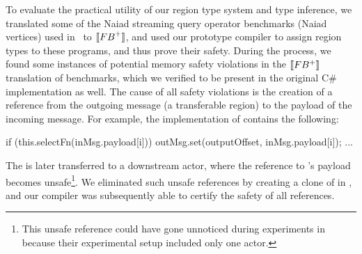 To evaluate the practical utility of our region type system and type
inference, we 
translated some of the Naiad streaming query operator benchmarks
(Naiad vertices) used in~\cite{Broom:HotOS} to $\llbracket {\sc FB}^+ \rrbracket$, and
used our prototype compiler to assign region types to these programs,
and thus prove their safety. During the process, we found some
instances of potential memory safety violations in the $\llbracket FB^+ \rrbracket$
translation of benchmarks, which we verified to be present in the
original C\# implementation as well. The cause of all safety
violations is the creation of a reference from the outgoing message (a
transferable region) to the payload of the incoming message. For
example, the implementation of  contains the
following:
\begin{codejava}
  if (this.selectFn(inMsg.payload[i])) {
    outMsg.set(outputOffset, inMsg.payload[i]);
    ...
  } 
\end{codejava}
The  is later transferred to a downstream actor, where the
reference to 's payload becomes unsafe\footnote{This unsafe
reference could have gone unnoticed during experiments
in~\cite{Broom:HotOS} because their experimental setup included only
one actor.}. We eliminated such unsafe references by creating a clone
of  in , and our compiler was
subsequently able to certify the safety of all references.


